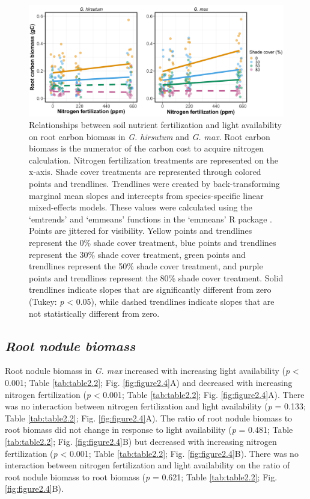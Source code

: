 \newpage
\begin{figure}
    \centering
    \includegraphics[width=\textwidth]{ch2_LxN_Greenhouse/figs/fig3_rootCarbon.png}
    \caption[Relationships between soil nitrogen fertilization and light availability on root carbon biomass in \textit{G. hirsutum} and \textit{G. max}]{Relationships between soil nutrient fertilization and light availability on root carbon biomass in \textit{G. hirsutum} and \textit{G. max}. Root carbon biomass is the numerator of the carbon cost to acquire nitrogen calculation. Nitrogen fertilization treatments are represented on the x-axis. Shade cover treatments are represented through colored points and trendlines. Trendlines were created by back-transforming marginal mean slopes and intercepts from species-specific linear mixed-effects models. These values were calculated using the ‘emtrends’ and ‘emmeans’ functions in the ‘emmeans’ R package . Points are jittered for visibility. Yellow points and trendlines represent the 0\% shade cover treatment, blue points and trendlines represent the 30\% shade cover treatment, green points and trendlines represent the 50\% shade cover treatment, and purple points and trendlines represent the 80\% shade cover treatment. Solid trendlines indicate slopes that are significantly different from zero (Tukey: \textit{p} < 0.05), while dashed trendlines indicate slopes that are not statistically different from zero.}
    \label{fig:figure2.3}
\end{figure}
\clearpage

\newpage
\subsection{\textit{Root nodule biomass}}
Root nodule biomass in \textit{G. max} increased with increasing light availability (\textit{p} < 0.001; Table \ref{tab:table2.2}; Fig. \ref{fig:figure2.4}A) and decreased with increasing nitrogen fertilization (\textit{p} < 0.001; Table \ref{tab:table2.2}; Fig. \ref{fig:figure2.4}A). There was no interaction between nitrogen fertilization and light availability (\textit{p} = 0.133; Table \ref{tab:table2.2}; Fig. \ref{fig:figure2.4}A). The ratio of root nodule biomass to root biomass did not change in response to light availability (\textit{p} = 0.481; Table \ref{tab:table2.2}; Fig. \ref{fig:figure2.4}B) but decreased with increasing nitrogen fertilization (\textit{p} < 0.001; Table \ref{tab:table2.2}; Fig. \ref{fig:figure2.4}B). There was no interaction between nitrogen fertilization and light availability on the ratio of root nodule biomass to root biomass (\textit{p} = 0.621; Table \ref{tab:table2.2}; Fig. \ref{fig:figure2.4}B).

